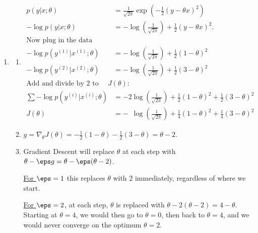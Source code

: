 \documentclass{article}
\begin{document}
\begin{enumerate}
\item \label{ML_ex_SGD_solution}
\newcommand{\MLexSGDlog}{\log\left(\frac{1}{\sqrt{2\pi}}\right)}
\begin{enumerate} 
    \item
    \begin{align*}
        p(y|x; \theta)                  & = \frac{1}{\sqrt{2\pi}}\exp\left(-\frac12(y-\theta x)^2\right) \\
        -\log p(y|x;\theta)             & = -\MLexSGDlog + \frac12(y-\theta x)^2.  \\
        \text{Now plug in the data points:}\\
        -\log p(y^{(1)}|x^{(1)};\theta) & = -\MLexSGDlog + \frac12(1-\theta)^2  \\
        -\log p(y^{(2)}|x^{(2)};\theta) & = -\MLexSGDlog + \frac12(3-\theta)^2  \\
        \text{Add and divide by 2 to find } J(\theta): \\
    \sum-\log p(y^{(i)}|x^{(i)};\theta) & = -2\MLexSGDlog + \frac12(1-\theta)^2+\frac12(3-\theta)^2 \\
        J(\theta)                      & = -\phantom{2}\MLexSGDlog + \frac14(1-\theta)^2 + \frac14(3-\theta)^2
    \end{align*}
    \item $g = \nabla_\theta J(\theta) = -\frac12(1-\theta) - \frac12(3-\theta) = \theta - 2$.
    \item Gradient Descent will replace $\theta$ at each step with $\theta - \eps g = \theta - \eps(\theta-2)$. 
    
    \underline{For $\eps = 1$} this replaces $\theta$ with $2$ immediately, regardless of where we start.
    
    \underline{For $\eps = 2$}, at each step, $\theta$ is replaced with $\theta - 2(\theta-2) = 4 - \theta$. Starting at $\theta = 4$, we would then go to $\theta = 0$, then back to $\theta = 4$, and we would never converge on the optimum $\theta = 2$.
    

\end{enumerate}
\end{enumerate}
\end{document}
